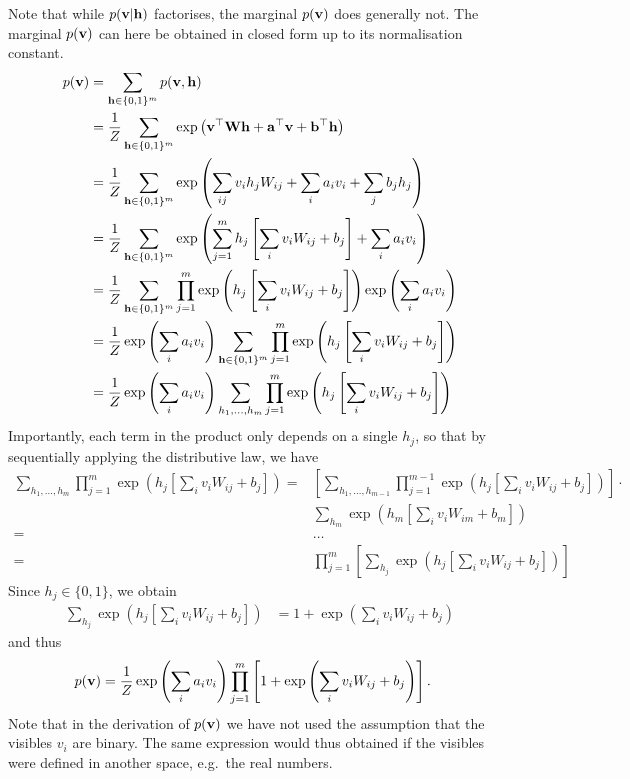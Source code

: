 \begin{exenumerate}
\begin{solution}
      Note that while $p(\mathbf{v} | \mathbf{h})$ factorises, the marginal $p(\mathbf{v})$
      does generally not. The marginal $p(\mathbf{v})$ can here be obtained in
      closed form up to its normalisation constant.
      \begin{align}
        p(\mathbf{v}) & = \sum_{\mathbf{h} \in \{0,1\}^m} p(\mathbf{v},\mathbf{h}) \\
        & = \frac{1}{Z} \sum_{\mathbf{h} \in \{0,1\}^m} \exp\left( \mathbf{v}^\top \mathbf{W} \mathbf{h} + \mathbf{a}^\top\mathbf{v} + \mathbf{b}^\top\mathbf{h} \right)\\
        & =  \frac{1}{Z}  \sum_{\mathbf{h} \in \{0,1\}^m} \exp\left( \sum_{ij} v_i h_j W_{ij} + \sum_i a_i v_i + \sum_j b_j h_j \right)\\
        & =  \frac{1}{Z}  \sum_{\mathbf{h} \in \{0,1\}^m} \exp\left( \sum_{j=1}^m h_j \left[\sum_i v_i W_{ij} + b_j\right] + \sum_i a_i v_i \right)\\
        & =  \frac{1}{Z}  \sum_{\mathbf{h} \in \{0,1\}^m} \prod_{j=1}^m \exp\left( h_j \left[\sum_i v_i W_{ij} + b_j\right] \right) \exp\left( \sum_i a_i v_i \right)\\
        & =  \frac{1}{Z} \exp\left( \sum_i a_i v_i \right) \sum_{\mathbf{h} \in \{0,1\}^m} \prod_{j=1}^m \exp\left( h_j \left[\sum_i v_i W_{ij} + b_j\right] \right) \\
        & =  \frac{1}{Z} \exp\left( \sum_i a_i v_i \right) \sum_{h_1, \ldots, h_m} \prod_{j=1}^m  \exp\left( h_j \left[\sum_i v_i W_{ij} + b_j\right] \right)
      \end{align}
      Importantly, each term in the product only depends on a single $h_j$, so that by sequentially applying the distributive law, we have
      \begin{align}
        \sum_{h_1, \ldots, h_m} \prod_{j=1}^m  \exp\left( h_j \left[\sum_i v_i W_{ij} + b_j\right] \right)  =& \left[ \sum_{h_1, \ldots, h_{m-1}} \prod_{j=1}^{m-1}  \exp\left( h_j \left[\sum_i v_i W_{ij} + b_j\right] \right)\right] \cdot \nonumber \\
        &\sum_{h_m} \exp\left( h_m \left[\sum_i v_i W_{im} + b_m\right] \right)\\
         =& \ldots \nonumber \\
        =& \prod_{j=1}^m \left[\sum_{h_j} \exp\left( h_j \left[\sum_i v_i W_{ij} + b_j\right] \right)\right]
      \end{align}
      Since $h_j \in \{0,1\}$, we obtain
      \begin{align}
        \sum_{h_j} \exp\left( h_j \left[\sum_i v_i W_{ij} + b_j\right] \right) & = 1+ \exp\left(\sum_i v_i W_{ij} + b_j \right)
      \end{align}
      and thus
       \begin{align}
         p(\mathbf{v}) & = \frac{1}{Z}  \exp\left( \sum_i a_i v_i \right) \prod_{j=1}^m \left[1+ \exp\left(\sum_i v_i W_{ij} + b_j \right)\right].
      \end{align}
       Note that in the derivation of $p(\mathbf{v})$ we have not used the
       assumption that the visibles $v_i$ are binary. The same
       expression would thus obtained if the visibles were defined in
       another space, e.g.\ the real numbers.
       

\end{solution}
\end{exenumerate}

